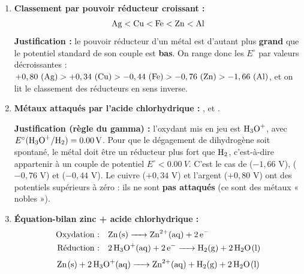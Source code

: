 \documentclass[11pt]{article}
\begin{document}
\begin{corrige}
\begin{enumerate}
\item \textbf{Classement par pouvoir réducteur croissant :}
\[ \ce{Ag} < \ce{Cu} < \ce{Fe} < \ce{Zn} < \ce{Al} \]
\textbf{Justification :} le pouvoir réducteur d'un métal est d'autant plus \textbf{grand} que le potentiel standard de son couple est \textbf{bas}. On range donc les $E^\circ$ par valeurs décroissantes : $+0,80\ (\ce{Ag}) > +0,34\ (\ce{Cu}) > -0,44\ (\ce{Fe}) > -0,76\ (\ce{Zn}) > -1,66\ (\ce{Al})$, et on lit le classement des réducteurs en sens inverse.
\item \textbf{Métaux attaqués par l'acide chlorhydrique :} ,  et .

\textbf{Justification (règle du gamma) :} l'oxydant mis en jeu est $\ce{H3O+}$, avec $E^\circ(\ce{H3O+}/\ce{H2}) = \SI{0,00}{V}$. Pour que le dégagement de dihydrogène soit spontané, le métal doit être un réducteur plus fort que $\ce{H2}$, c'est-à-dire appartenir à un couple de potentiel $E^\circ < \SI{0,00}{V}$. C'est le cas de  ($-1,66$ V),  ($-0,76$ V) et  ($-0,44$ V). Le cuivre ($+0,34$ V) et l'argent ($+0,80$ V) ont des potentiels supérieurs à zéro : ils ne sont \textbf{pas attaqués} (ce sont des métaux « nobles »).
\item \textbf{Équation-bilan zinc + acide chlorhydrique :}
\begin{align*}
\text{Oxydation :}\quad & \ce{Zn(s) -> Zn^2+(aq) + 2e-} \\
\text{Réduction :}\quad & \ce{2H3O+(aq) + 2e- -> H2(g) + 2H2O(l)}
\end{align*}
\[ \ce{Zn(s) + 2H3O+(aq) -> Zn^2+(aq) + H2(g) + 2H2O(l)} \]
\end{enumerate}
\end{corrige}
\end{document}
